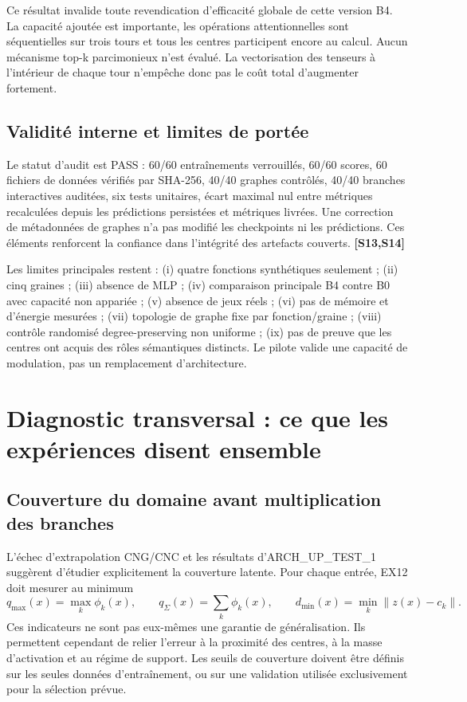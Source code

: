 \documentclass[11pt,a4paper]{article}
\newcommand{\src}[1]{\textbf{[#1]}}
\begin{document}
Ce résultat invalide toute revendication d'efficacité globale de cette version B4. La capacité ajoutée est importante, les opérations attentionnelles sont séquentielles sur trois tours et tous les centres participent encore au calcul. Aucun mécanisme top-k parcimonieux n'est évalué. La vectorisation des tenseurs à l'intérieur de chaque tour n'empêche donc pas le coût total d'augmenter fortement.

\subsection{Validité interne et limites de portée}

Le statut d'audit est PASS : 60/60 entraînements verrouillés, 60/60 scores, 60 fichiers de données vérifiés par SHA-256, 40/40 graphes contrôlés, 40/40 branches interactives auditées, six tests unitaires, écart maximal nul entre métriques recalculées depuis les prédictions persistées et métriques livrées. Une correction de métadonnées de graphes n'a pas modifié les checkpoints ni les prédictions. Ces éléments renforcent la confiance dans l'intégrité des artefacts couverts. \src{S13,S14}

Les limites principales restent : (i) quatre fonctions synthétiques seulement ; (ii) cinq graines ; (iii) absence de MLP ; (iv) comparaison principale B4 contre B0 avec capacité non appariée ; (v) absence de jeux réels ; (vi) pas de mémoire et d'énergie mesurées ; (vii) topologie de graphe fixe par fonction/graine ; (viii) contrôle randomisé degree-preserving non uniforme ; (ix) pas de preuve que les centres ont acquis des rôles sémantiques distincts. Le pilote valide une capacité de modulation, pas un remplacement d'architecture.

\section{Diagnostic transversal : ce que les expériences disent ensemble}

\subsection{Couverture du domaine avant multiplication des branches}

L'échec d'extrapolation CNG/CNC et les résultats d'ARCH\_UP\_TEST\_1 suggèrent d'étudier explicitement la couverture latente. Pour chaque entrée, EX12 doit mesurer au minimum
\[
 q_{\max}(x)=\max_k\phi_k(x),\qquad
 q_{\Sigma}(x)=\sum_k\phi_k(x),\qquad
 d_{\min}(x)=\min_k\|z(x)-c_k\|.
\]
Ces indicateurs ne sont pas eux-mêmes une garantie de généralisation. Ils permettent cependant de relier l'erreur à la proximité des centres, à la masse d'activation et au régime de support. Les seuils de couverture doivent être définis sur les seules données d'entraînement, ou sur une validation utilisée exclusivement pour la sélection prévue.
\end{document}
